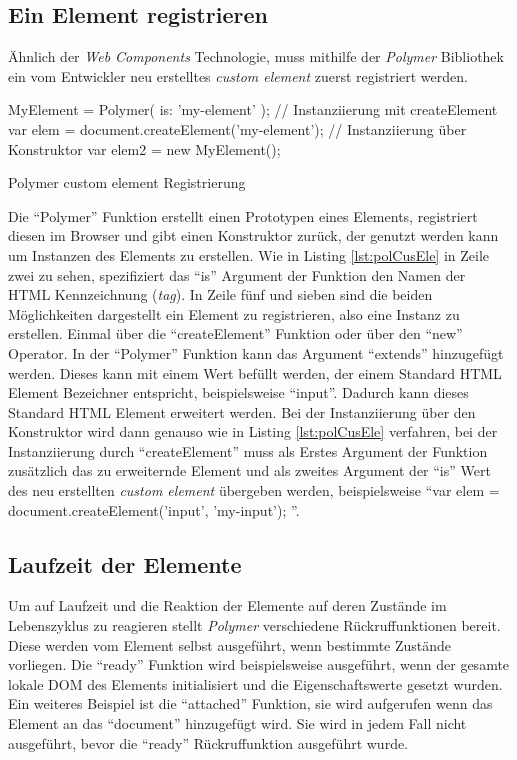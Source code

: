 \documentclass[12pt, paper=a4, bibtotoc, toc=listof, headsepline=true]{scrreprt}
\begin{document}
		\subsection{Ein Element registrieren}
		Ähnlich der \emph{Web Components} Technologie, muss mithilfe der \emph{Polymer} Bibliothek ein vom Entwickler neu erstelltes \emph{custom element} zuerst registriert werden. 
		\begin{listing}
		\begin{JavaScriptcode*}{}
	MyElement = Polymer({
	   is: 'my-element'
	});
	// Instanziierung mit createElement
	var elem = document.createElement('my-element');
	// Instanziierung über Konstruktor
	var elem2 = new MyElement();
		\end{JavaScriptcode*}
		\caption{Polymer custom element Registrierung}
		\label{lst:polCusEle}
		\end{listing}
Die \enquote{Polymer} Funktion erstellt einen Prototypen eines Elements, registriert diesen im Browser und gibt einen Konstruktor zurück, der genutzt werden kann um Instanzen des Elements zu erstellen. Wie in Listing \ref{lst:polCusEle} in Zeile zwei zu sehen, spezifiziert das \enquote{is} Argument der Funktion den Namen der \ac{HTML} Kennzeichnung (\emph{tag}). In Zeile fünf und sieben sind die beiden Möglichkeiten dargestellt ein Element zu registrieren, also eine Instanz zu erstellen. Einmal über die \enquote{createElement} Funktion oder über den \enquote{new} Operator. In der \enquote{Polymer} Funktion kann das Argument \enquote{extends} hinzugefügt werden. Dieses kann mit einem Wert befüllt werden, der einem Standard \ac{HTML} Element Bezeichner entspricht, beispielsweise \enquote{input}. Dadurch kann dieses Standard \ac{HTML} Element erweitert werden. Bei der Instanziierung über den Konstruktor wird dann genauso wie in Listing \ref{lst:polCusEle} verfahren, bei der Instanziierung durch \enquote{createElement} muss als Erstes Argument der Funktion zusätzlich das zu erweiternde Element und als zweites Argument der \enquote{is} Wert des neu erstellten \emph{custom element} übergeben werden, beispielsweise \enquote{var elem = document.createElement('input', 'my-input');
}\cite{polyReg}.
\subsection{Laufzeit der Elemente}
\label{sec:polLau}
Um auf Laufzeit und die Reaktion der Elemente auf deren Zustände im Lebenszyklus zu reagieren stellt \emph{Polymer} verschiedene Rückruffunktionen bereit. Diese werden vom Element selbst ausgeführt, wenn bestimmte Zustände vorliegen. Die \enquote{ready} Funktion wird beispielsweise ausgeführt, wenn der gesamte lokale \ac{DOM} des Elements initialisiert und die Eigenschaftswerte gesetzt wurden. Ein weiteres Beispiel ist die \enquote{attached} Funktion, sie wird aufgerufen wenn das Element an das \enquote{document} hinzugefügt wird. Sie wird in jedem Fall nicht ausgeführt, bevor die \enquote{ready} Rückruffunktion ausgeführt wurde\cite{polyReg}.
\end{document}
